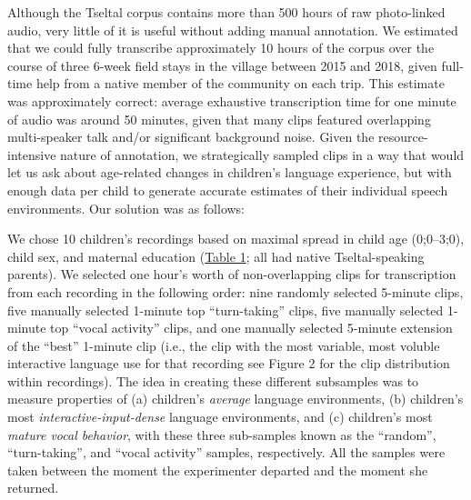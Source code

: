 \documentclass[floatsintext,man]{apa6}
\theoremstyle{definition}
\theoremstyle{definition}
\theoremstyle{definition}
\theoremstyle{remark}
\begin{document}
Although the Tseltal corpus contains more than 500 hours of raw
photo-linked audio, very little of it is useful without adding manual
annotation. We estimated that we could fully transcribe approximately 10
hours of the corpus over the course of three 6-week field stays in the
village between 2015 and 2018, given full-time help from a native member
of the community on each trip. This estimate was approximately correct:
average exhaustive transcription time for one minute of audio was around
50 minutes, given that many clips featured overlapping multi-speaker
talk and/or significant background noise. Given the resource-intensive
nature of annotation, we strategically sampled clips in a way that would
let us ask about age-related changes in children's language experience,
but with enough data per child to generate accurate estimates of their
individual speech environments. Our solution was as follows:

We chose 10 children's recordings based on maximal spread in child age
(0;0--3;0), child sex, and maternal education
(\protect\hyperlink{tab1}{Table 1}; all had native Tseltal-speaking
parents). We selected one hour's worth of non-overlapping clips for
transcription from each recording in the following order: nine randomly
selected 5-minute clips, five manually selected 1-minute top
\enquote{turn-taking} clips, five manually selected 1-minute top
\enquote{vocal activity} clips, and one manually selected 5-minute
extension of the \enquote{best} 1-minute clip (i.e., the clip with the
most variable, most voluble interactive language use for that recording
see Figure 2 for the clip distribution within recordings). The idea in
creating these different subsamples was to measure properties of (a)
children's \emph{average} language environments, (b) children's most
\emph{interactive-input-dense} language environments, and (c) children's
most \emph{mature vocal behavior}, with these three sub-samples known as
the \enquote{random}, \enquote{turn-taking}, and \enquote{vocal
activity} samples, respectively. All the samples were taken between the
moment the experimenter departed and the moment she returned.
\end{document}

